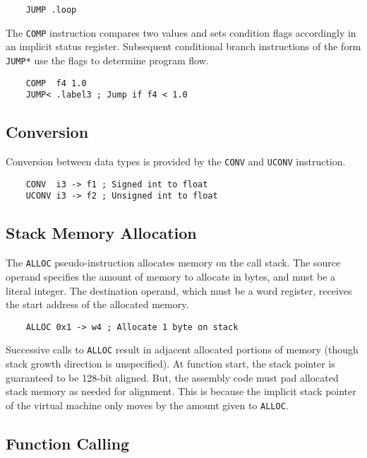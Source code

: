 \begin{verbatim}
    JUMP .loop
\end{verbatim}

The \texttt{COMP} instruction compares two values and sets condition flags
accordingly in an implicit status register. Subsequent conditional branch instructions of the
form \texttt{JUMP*} use the flags to determine program flow.

\begin{verbatim}
    COMP  f4 1.0
    JUMP< .label3 ; Jump if f4 < 1.0
\end{verbatim}

\subsection{Conversion}

Conversion between data types is provided by the
\texttt{CONV} and \texttt{UCONV} instruction.

\begin{verbatim}
    CONV  i3 -> f1 ; Signed int to float
    UCONV i3 -> f2 ; Unsigned int to float
\end{verbatim}

\subsection{Stack Memory Allocation}

The \texttt{ALLOC} pseudo-instruction allocates memory
on the call stack. The source operand
specifies the amount of memory to allocate in bytes,
and must be a literal integer. The destination operand, which must
be a word register, receives the start address of the
allocated memory.

\begin{verbatim}
    ALLOC 0x1 -> w4 ; Allocate 1 byte on stack
\end{verbatim}

Successive calls to \texttt{ALLOC} result in adjacent
allocated portions of memory (though stack growth direction
is unspecified). At function start, the stack pointer
is guaranteed to be 128-bit aligned. But, the assembly
code must pad allocated stack memory as needed for alignment.
This is because the implicit stack pointer of
the virtual machine only moves by the amount given to \texttt{ALLOC}.

\subsection{Function Calling}

